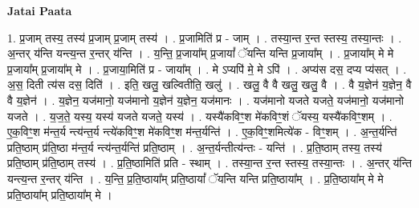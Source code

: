 \documentclass[17pt]{extarticle}
\begin{document}
\textbf{Jatai Paata} \newline

1. प्र॒जाम् तस्य॒ तस्य॑ प्र॒जाम् प्र॒जाम् तस्य॑ । . प्र॒जामिति॑ प्र - जाम् । . तस्या॒न्त र॒न्त स्तस्य॒ तस्या॒न्तः । . अ॒न्तर् य॑न्ति यन्त्य॒न्त र॒न्तर् य॑न्ति । . य॒न्ति॒ प्र॒जाया᳚म् प्र॒जायां᳚ ॅयन्ति यन्ति प्र॒जाया᳚म् । . प्र॒जाया᳚म् मे मे प्र॒जाया᳚म् प्र॒जाया᳚म् मे । . प्र॒जाया॒मिति॑ प्र - जाया᳚म् । . मे ऽप्यपि॑ मे॒ मे ऽपि॑ । . अप्य॑स दस॒ दप्य प्य॑सत् । . अ॒स॒ दिती त्य॑स दस॒ दिति॑ । . इति॒ खलु॒ खल्वितीति॒ खलु॑ । . खलु॒ वै वै खलु॒ खलु॒ वै । . वै य॒ज्ञेन॑ य॒ज्ञेन॒ वै वै य॒ज्ञेन॑ । . य॒ज्ञेन॒ यज॑मानो॒ यज॑मानो य॒ज्ञेन॑ य॒ज्ञेन॒ यज॑मानः । . यज॑मानो यजते यजते॒ यज॑मानो॒ यज॑मानो यजते । . य॒ज॒ते॒ यस्य॒ यस्य॑ यजते यजते॒ यस्य॑ । . यस्यै॑कविꣳ॒॒श मे॑कविꣳ॒॒शं ॅयस्य॒ यस्यै॑कविꣳ॒॒शम् । . ए॒क॒विꣳ॒॒श म॑न्त॒र्य न्त्य॑न्त॒र्य न्त्ये॑कविꣳ॒॒श मे॑कविꣳ॒॒श म॑न्त॒र्यन्ति॑ । . ए॒क॒विꣳ॒॒शमित्ये॑क - विꣳ॒॒शम् । . अ॒न्त॒र्यन्ति॑ प्रति॒ष्ठाम् प्र॑ति॒ष्ठा म॑न्त॒र्य न्त्य॑न्त॒र्यन्ति॑ प्रति॒ष्ठाम् । . अ॒न्त॒र्यन्तीत्य॑न्तः - यन्ति॑ । . प्र॒ति॒ष्ठाम् तस्य॒ तस्य॑ प्रति॒ष्ठाम् प्र॑ति॒ष्ठाम् तस्य॑ । . प्र॒ति॒ष्ठामिति॑ प्रति - स्थाम् । . तस्या॒न्त र॒न्त स्तस्य॒ तस्या॒न्तः । . अ॒न्तर् य॑न्ति यन्त्य॒न्त र॒न्तर् य॑न्ति । . य॒न्ति॒ प्र॒ति॒ष्ठाया᳚म् प्रति॒ष्ठायां᳚ ॅयन्ति यन्ति प्रति॒ष्ठाया᳚म् । . प्र॒ति॒ष्ठाया᳚म् मे मे प्रति॒ष्ठाया᳚म् प्रति॒ष्ठाया᳚म् मे । \newline
\end{document}
